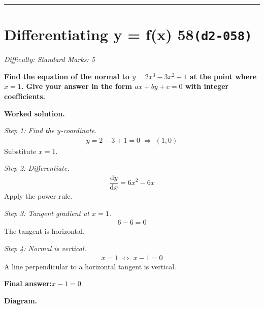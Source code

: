 \documentclass[11pt]{article}
\newcommand{\question}[1]{\par\medskip\noindent\textbf{#1}\par}
\begin{document}
\medskip\hrule

\section*{Differentiating y = f(x) 58\quad\small\texttt{(d2-058)}}
\textit{Difficulty: Standard \quad\textbar\quad Marks: 5}

\question{Find the equation of the normal to \( y = 2x^3 - 3x^2 + 1 \) at the point where \( x = 1 \). Give your answer in the form \( ax + by + c = 0 \) with integer coefficients.}

\textbf{Worked solution.}

\textit{Step 1: Find the \( y \)-coordinate.}
\[\begin{gathered}
y = 2 - 3 + 1 = 0 \;\Rightarrow\; (1, 0)
\end{gathered}\]
Substitute \( x = 1 \).

\textit{Step 2: Differentiate.}
\[\begin{gathered}
\dfrac{\mathrm{d}y}{\mathrm{d}x} = 6x^2 - 6x
\end{gathered}\]
Apply the power rule.

\textit{Step 3: Tangent gradient at \( x = 1 \).}
\[\begin{gathered}
6 - 6 = 0
\end{gathered}\]
The tangent is horizontal.

\textit{Step 4: Normal is vertical.}
\[\begin{gathered}
x = 1 \;\Leftrightarrow\; x - 1 = 0
\end{gathered}\]
A line perpendicular to a horizontal tangent is vertical.

\begin{answerbox}
\textbf{Final answer:}\quad \(\displaystyle  x - 1 = 0 \)
\end{answerbox}
\textbf{Diagram.}
\end{document}
